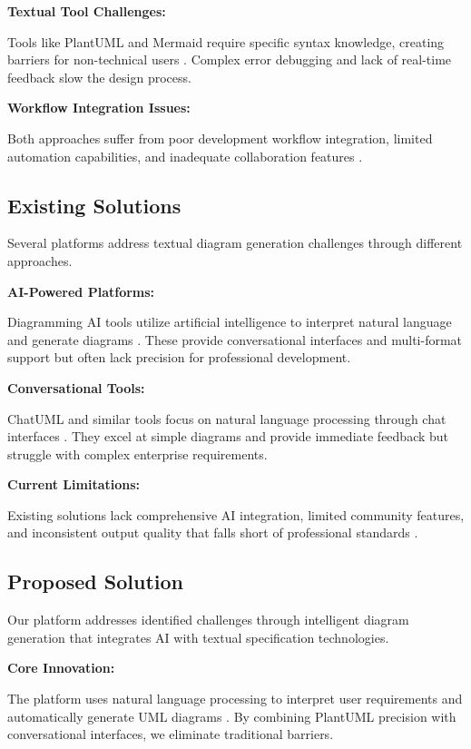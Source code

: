 \textbf{Textual Tool Challenges:}

Tools like PlantUML and Mermaid require specific syntax knowledge, creating barriers for non-technical users \cite{plantuml_guide}. Complex error debugging and lack of real-time feedback slow the design process.

\textbf{Workflow Integration Issues:}

Both approaches suffer from poor development workflow integration, limited automation capabilities, and inadequate collaboration features \cite{workflow_integration}.

\subsection{Existing Solutions}

Several platforms address textual diagram generation challenges through different approaches.

\textbf{AI-Powered Platforms:}

Diagramming AI tools utilize artificial intelligence to interpret natural language and generate diagrams \cite{diagramming_ai}. These provide conversational interfaces and multi-format support but often lack precision for professional development.

\textbf{Conversational Tools:}

ChatUML and similar tools focus on natural language processing through chat interfaces \cite{chatuml}. They excel at simple diagrams and provide immediate feedback but struggle with complex enterprise requirements.

\textbf{Current Limitations:}

Existing solutions lack comprehensive AI integration, limited community features, and inconsistent output quality that falls short of professional standards \cite{existing_tools_analysis}.

\subsection{Proposed Solution}

Our platform addresses identified challenges through intelligent diagram generation that integrates AI with textual specification technologies.

\textbf{Core Innovation:}

The platform uses natural language processing to interpret user requirements and automatically generate UML diagrams \cite{nlp_diagramming}. By combining PlantUML precision with conversational interfaces, we eliminate traditional barriers.

